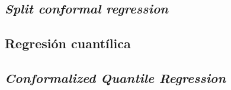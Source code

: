 \subsection{\textit{Split conformal regression}}


\subsection{Regresión cuantílica}


\subsection{\textit{Conformalized Quantile Regression}}



\section{}










